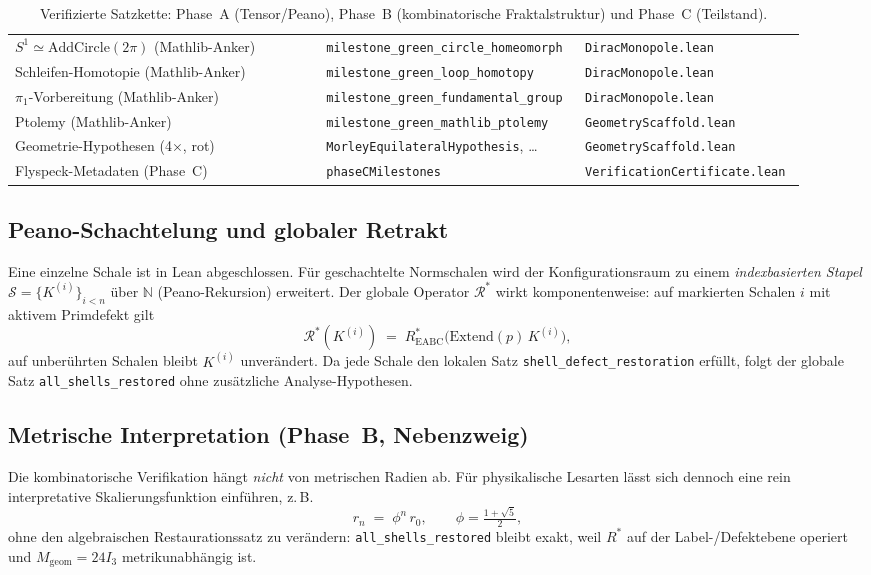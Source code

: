 \documentclass[11pt,a4paper]{article}
\begin{document}
\begin{table}[h!]
\begin{tabular}{p{0.38\linewidth}p{0.30\linewidth}p{0.24\linewidth}}
			$S^1\simeq\mathrm{AddCircle}(2\pi)$ (Mathlib-Anker)
			& \texttt{milestone\_green\_circle\_homeomorph} & \texttt{DiracMonopole.lean} \\
			Schleifen-Homotopie (Mathlib-Anker)
			& \texttt{milestone\_green\_loop\_homotopy} & \texttt{DiracMonopole.lean} \\
			$\pi_1$-Vorbereitung (Mathlib-Anker)
			& \texttt{milestone\_green\_fundamental\_group} & \texttt{DiracMonopole.lean} \\
			Ptolemy (Mathlib-Anker)
			& \texttt{milestone\_green\_mathlib\_ptolemy} & \texttt{GeometryScaffold.lean} \\
			Geometrie-Hypothesen (4$\times$, rot)
			& \texttt{MorleyEquilateralHypothesis}, \ldots &
			\texttt{GeometryScaffold.lean} \\
			Flyspeck-Metadaten (Phase~C)
			& \texttt{phaseCMilestones} & \texttt{VerificationCertificate.lean} \\
			\hline
		\end{tabular}
		\caption{Verifizierte Satzkette: Phase~A (Tensor/Peano), Phase~B (kombinatorische Fraktalstruktur) und Phase~C (Teilstand).}
		\label{tab:lean-theorems}
	\end{table}
	
	\subsection{Peano-Schachtelung und globaler Retrakt}
	
	Eine einzelne Schale ist in Lean abgeschlossen.
	Für geschachtelte Normschalen wird der Konfigurationsraum zu einem
	\emph{indexbasierten Stapel} $\mathcal{S}=\{K^{(i)}\}_{i<n}$ über
	$\mathbb{N}$ (Peano-Rekursion) erweitert.
	Der globale Operator $\mathcal{R}^*$ wirkt komponentenweise:
	auf markierten Schalen $i$ mit aktivem Primdefekt gilt
	\[
	\mathcal{R}^*(K^{(i)}) \;=\; R^*_{\mathrm{EABC}}\!\bigl(\mathrm{Extend}(p)\,K^{(i)}\bigr),
	\]
	auf unberührten Schalen bleibt $K^{(i)}$ unverändert.
	Da jede Schale den lokalen Satz \texttt{shell\_defect\_restoration} erfüllt,
	folgt der globale Satz \texttt{all\_shells\_restored} ohne zusätzliche
	Analyse-Hypothesen.
	
	\subsection{Metrische Interpretation (Phase~B, Nebenzweig)}
	
	Die kombinatorische Verifikation hängt \emph{nicht} von metrischen Radien ab.
	Für physikalische Lesarten lässt sich dennoch eine rein interpretative
	Skalierungsfunktion einführen, z.\,B.
	\[
	r_n \;=\; \phi^n\,r_0,
	\qquad \phi=\tfrac{1+\sqrt5}{2},
	\]
	ohne den algebraischen Restaurationssatz zu verändern:
	\texttt{all\_shells\_restored} bleibt exakt, weil $R^*$ auf der
	Label-/Defektebene operiert und $M_{\mathrm{geom}}=24I_3$ metrikunabhängig ist.
	
\end{document}
